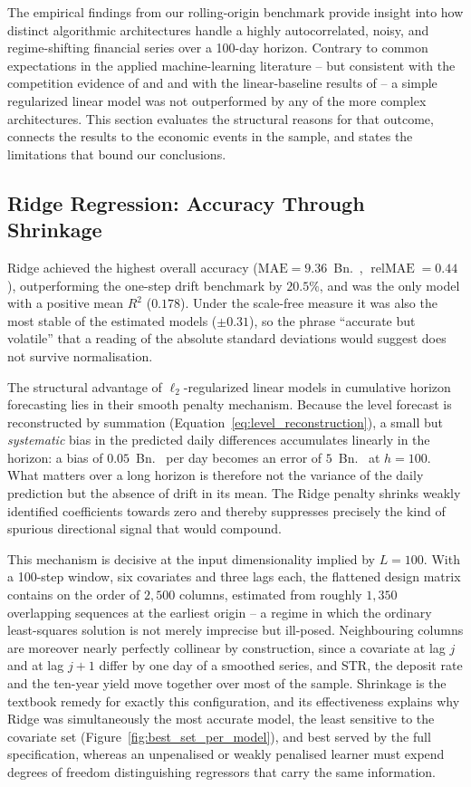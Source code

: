 \documentclass[11pt,a4paper]{article}
\newcommand{\estr}{\mbox{\texteuro STR}}
\begin{document}
The empirical findings from our rolling-origin benchmark provide insight into
how distinct algorithmic architectures handle a highly autocorrelated, noisy,
and regime-shifting financial series over a 100-day horizon. Contrary to
common expectations in the applied machine-learning literature -- but
consistent with the competition evidence of \citet{makridakis2020m4} and
\citet{makridakis2022m5} and with the linear-baseline results of
\citet{zeng2023transformers} -- a simple regularized linear model was not
outperformed by any of the more complex architectures. This section evaluates
the structural reasons for that outcome, connects the results to the economic
events in the sample, and states the limitations that bound our conclusions.

\subsection{Ridge Regression: Accuracy Through Shrinkage}
Ridge achieved the highest overall accuracy ($\text{MAE} = 9.36$~Bn.~\texteuro,
$\operatorname{relMAE} = 0.44$), outperforming the one-step drift benchmark by
$20.5\%$, and was the only model with a positive mean $R^2$ ($0.178$). Under
the scale-free measure it was also the most stable of the estimated models
($\pm 0.31$), so the phrase ``accurate but volatile'' that a reading of the
absolute standard deviations would suggest does not survive normalisation.

The structural advantage of $\ell_2$-regularized linear models in cumulative
horizon forecasting lies in their smooth penalty mechanism. Because the level
forecast is reconstructed by summation
(Equation~\eqref{eq:level_reconstruction}), a small but \emph{systematic} bias
in the predicted daily differences accumulates linearly in the horizon: a bias
of $0.05$~Bn.~\texteuro{} per day becomes an error of $5$~Bn.~\texteuro{} at
$h=100$. What matters over a long horizon is therefore not the variance of the
daily prediction but the absence of drift in its mean. The Ridge penalty
shrinks weakly identified coefficients towards zero and thereby suppresses
precisely the kind of spurious directional signal that would compound.

This mechanism is decisive at the input dimensionality implied by $L=100$.
With a 100-step window, six covariates and three lags each, the flattened
design matrix contains on the order of $2{,}500$ columns, estimated from
roughly $1{,}350$ overlapping sequences at the earliest origin -- a regime in
which the ordinary least-squares solution is not merely imprecise but
ill-posed. Neighbouring columns are moreover nearly perfectly collinear by
construction, since a covariate at lag $j$ and at lag $j+1$ differ by one day
of a smoothed series, and \estr, the deposit rate and the ten-year yield move
together over most of the sample. Shrinkage is the textbook remedy for exactly
this configuration, and its effectiveness explains why Ridge was
simultaneously the most accurate model, the least sensitive to the covariate
set (Figure~\ref{fig:best_set_per_model}), and best served by the full
specification, whereas an unpenalised or weakly penalised learner must expend
degrees of freedom distinguishing regressors that carry the same information.
\end{document}
